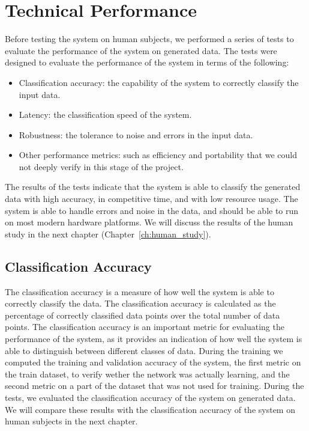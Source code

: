 \chapter{Technical Performance}\label{ch:testing}
Before testing the system on human subjects, we performed a series of tests to evaluate the performance of the system on generated data. 
The tests were designed to evaluate the performance of the system in terms of the following:
\begin{itemize}
    \item Classification accuracy: the capability of the system to correctly classify the input data.
    \item Latency: the classification speed of the system.
    \item Robustness: the tolerance to noise and errors in the input data.
    \item Other performance metrics: such as efficiency and portability that we could not deeply verify in this stage of the project.
\end{itemize}
The results of the tests indicate that the system is able to classify the generated data with high accuracy, in competitive time, and with low resource usage.
The system is able to handle errors and noise in the data, and should be able to run on most modern hardware platforms.
We will discuss the results of the human study in the next chapter (Chapter~\ref{ch:human_study}).

\section{Classification Accuracy}
The classification accuracy is a measure of how well the system is able to correctly classify the data.
The classification accuracy is calculated as the percentage of correctly classified data points over the total number of data points.
The classification accuracy is an important metric for evaluating the performance of the system, as it provides an indication of how well the system is able to distinguish between different classes of data.
During the training we computed the training and validation accuracy of the system, the first metric on the train dataset, to verify wether the network was actually learning, and the second metric on a part of the dataset that was not used for training.
During the tests, we evaluated the classification accuracy of the system on generated data.
We will compare these results with the classification accuracy of the system on human subjects in the next chapter.

